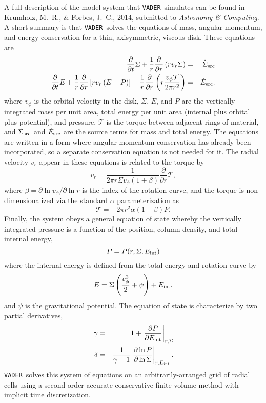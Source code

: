 \documentclass[12pt]{article}
\newcommand{\vader}{\texttt{VADER}}
\newcommand{\ddt}{\frac{\partial}{\partial t}}
\newcommand{\ddr}{\frac{\partial}{\partial r}}
\begin{document}
A full description of the model system that \vader\ simulates can be found in Krumholz, M.~R., \& Forbes, J.~C., 2014, submitted to \textit{Astronomy \& Computing}. A short summary is that \vader\ solves the equations of mass, angular momentum, and energy conservation for a thin, axisymmetric, viscous disk. These equations are
\begin{eqnarray}
\label{eq:masscons}
\ddt \Sigma + \frac{1}{r}\ddr \left(r v_r \Sigma\right) & = & \dot{\Sigma}_{\rm src} \\
\label{eq:encons}
\ddt E + \frac{1}{r}\ddr \left[rv_r\left(E+P\right)\right] - \frac{1}{r}\ddr \left(r \frac{v_\phi \mathcal{T}}{2\pi r^2}\right) & = & \dot{E}_{\rm src}.
\end{eqnarray}
where $v_\phi$ is the orbital velocity in the disk, $\Sigma$, $E$, and $P$ are the vertically-integrated mass per unit area, total energy per unit area (internal plus orbital plus potential), and pressure, $\mathcal{T}$ is the torque between adjacent rings of material, and $\dot{\Sigma}_{\rm src}$ and $\dot{E}_{\rm src}$ are the source terms for mass and total energy. The equations are written in a form where angular momentum conservation has already been incorporated, so a separate conservation equation is not needed for it. The radial velocity $v_r$ appear in these equations is related to the torque by
\begin{equation}
\label{eq:vr}
v_r = \frac{1}{2\pi r\Sigma v_\phi (1+ \beta)} \ddr\mathcal{T},
\end{equation}
where $\beta = \partial \ln v_\phi /\partial \ln r$ is the index of the rotation curve, and the torque is non-dimensionalized via the standard $\alpha$ parameterization as
\begin{equation}
\label{eq:alphatorque}
\mathcal{T} = -2\pi r^2 \alpha (1-\beta) P.
\end{equation}
Finally, the system obeys a general equation of state whereby the vertically integrated pressure is a function of the position, column density, and total internal energy,
\begin{equation}
P = P(r,\Sigma,E_{\rm int})
\end{equation}
where the internal energy is defined from the total energy and rotation curve by
\begin{equation}
E = \Sigma\left(\frac{v_\phi^2}{2}+\psi\right) + E_{\rm int},
\end{equation}
and $\psi$ is the gravitational potential. The equation of state is characterize by two partial derivatives,
\begin{eqnarray}
\gamma & = & 1+\left.\frac{\partial P}{\partial E_{\rm int}}\right|_{r,\Sigma} \\
\delta & = & \frac{1}{\gamma-1} \left.\frac{\partial \ln P}{\partial \ln \Sigma}\right|_{r,E_{\rm int}}.
\end{eqnarray}
\vader\ solves this system of equations on an arbitrarily-arranged grid of radial cells using a second-order accurate conservative finite volume method with implicit time discretization.
\end{document}
